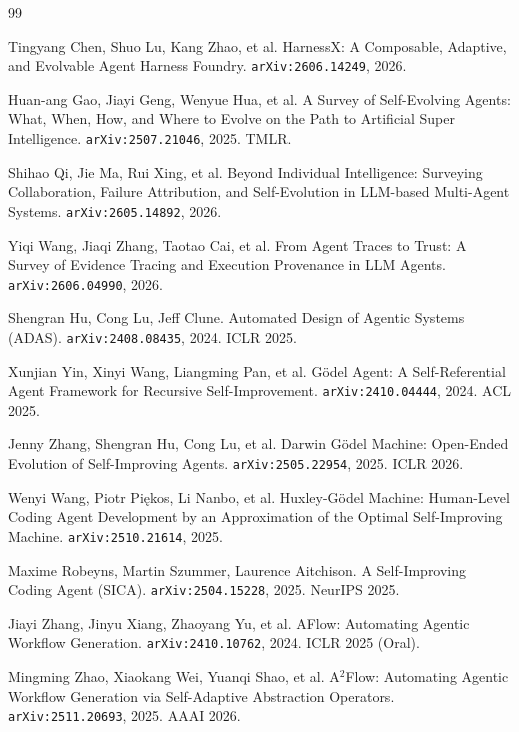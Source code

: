 \begin{thebibliography}{99}

 Tingyang Chen, Shuo Lu, Kang Zhao, et al. HarnessX: A
  Composable, Adaptive, and Evolvable Agent Harness Foundry.
  \texttt{arXiv:2606.14249}, 2026.

 Huan-ang Gao, Jiayi Geng, Wenyue Hua, et al.
  A Survey of Self-Evolving Agents: What, When, How, and Where to Evolve
  on the Path to Artificial Super Intelligence. \texttt{arXiv:2507.21046},
  2025. TMLR.

 Shihao Qi, Jie Ma, Rui Xing, et al. Beyond
  Individual Intelligence: Surveying Collaboration, Failure Attribution,
  and Self-Evolution in LLM-based Multi-Agent Systems.
  \texttt{arXiv:2605.14892}, 2026.

 Yiqi Wang, Jiaqi Zhang, Taotao Cai, et al.
  From Agent Traces to Trust: A Survey of Evidence Tracing and Execution
  Provenance in LLM Agents. \texttt{arXiv:2606.04990}, 2026.

 Shengran Hu, Cong Lu, Jeff Clune. Automated Design of
  Agentic Systems (ADAS). \texttt{arXiv:2408.08435}, 2024. ICLR 2025.

 Xunjian Yin, Xinyi Wang, Liangming Pan, et al.
  G\"odel Agent: A Self-Referential Agent Framework for Recursive
  Self-Improvement. \texttt{arXiv:2410.04444}, 2024. ACL 2025.

 Jenny Zhang, Shengran Hu, Cong Lu, et al. Darwin G\"odel
  Machine: Open-Ended Evolution of Self-Improving Agents.
  \texttt{arXiv:2505.22954}, 2025. ICLR 2026.

 Wenyi Wang, Piotr Pi\k{e}kos, Li Nanbo, et al. Huxley-G\"odel
  Machine: Human-Level Coding Agent Development by an Approximation of the
  Optimal Self-Improving Machine. \texttt{arXiv:2510.21614}, 2025.

 Maxime Robeyns, Martin Szummer, Laurence Aitchison. A
  Self-Improving Coding Agent (SICA). \texttt{arXiv:2504.15228}, 2025.
  NeurIPS 2025.

 Jiayi Zhang, Jinyu Xiang, Zhaoyang Yu, et al. AFlow:
  Automating Agentic Workflow Generation. \texttt{arXiv:2410.10762}, 2024.
  ICLR 2025 (Oral).

 Mingming Zhao, Xiaokang Wei, Yuanqi Shao, et al.
  A$^2$Flow: Automating Agentic Workflow Generation via Self-Adaptive
  Abstraction Operators. \texttt{arXiv:2511.20693}, 2025. AAAI 2026.


\end{thebibliography}
